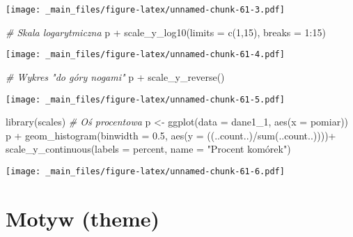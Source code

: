 \documentclass[
]{book}
\newenvironment{Shaded}{\begin{snugshade}}{\end{snugshade}}
\newcommand{\AttributeTok}[1]{\textcolor[rgb]{0.77,0.63,0.00}{#1}}
\newcommand{\CommentTok}[1]{\textcolor[rgb]{0.56,0.35,0.01}{\textit{#1}}}
\newcommand{\DecValTok}[1]{\textcolor[rgb]{0.00,0.00,0.81}{#1}}
\newcommand{\FloatTok}[1]{\textcolor[rgb]{0.00,0.00,0.81}{#1}}
\newcommand{\FunctionTok}[1]{\textcolor[rgb]{0.00,0.00,0.00}{#1}}
\newcommand{\NormalTok}[1]{#1}
\newcommand{\OtherTok}[1]{\textcolor[rgb]{0.56,0.35,0.01}{#1}}
\newcommand{\SpecialCharTok}[1]{\textcolor[rgb]{0.00,0.00,0.00}{#1}}
\newcommand{\StringTok}[1]{\textcolor[rgb]{0.31,0.60,0.02}{#1}}
\begin{document}
\texttt{[image: \_main\_files/figure-latex/unnamed-chunk-61-3.pdf]}

\begin{Shaded}
\begin{Highlighting}[]
\CommentTok{\# Skala logarytmiczna}
\NormalTok{p }\SpecialCharTok{+} \FunctionTok{scale\_y\_log10}\NormalTok{(}\AttributeTok{limits =} \FunctionTok{c}\NormalTok{(}\DecValTok{1}\NormalTok{,}\DecValTok{15}\NormalTok{), }\AttributeTok{breaks =} \DecValTok{1}\SpecialCharTok{:}\DecValTok{15}\NormalTok{)}
\end{Highlighting}
\end{Shaded}

\texttt{[image: \_main\_files/figure-latex/unnamed-chunk-61-4.pdf]}

\begin{Shaded}
\begin{Highlighting}[]
\CommentTok{\# Wykres "do góry nogami"}
\NormalTok{p }\SpecialCharTok{+} \FunctionTok{scale\_y\_reverse}\NormalTok{()}
\end{Highlighting}
\end{Shaded}

\texttt{[image: \_main\_files/figure-latex/unnamed-chunk-61-5.pdf]}

\begin{Shaded}
\begin{Highlighting}[]
\FunctionTok{library}\NormalTok{(scales)}
\CommentTok{\# Oś procentowa}
\NormalTok{p }\OtherTok{\textless{}{-}} \FunctionTok{ggplot}\NormalTok{(}\AttributeTok{data =}\NormalTok{ dane1\_1, }\FunctionTok{aes}\NormalTok{(}\AttributeTok{x =}\NormalTok{ pomiar))}
\NormalTok{p }\SpecialCharTok{+} \FunctionTok{geom\_histogram}\NormalTok{(}\AttributeTok{binwidth =} \FloatTok{0.5}\NormalTok{, }\FunctionTok{aes}\NormalTok{(}\AttributeTok{y =}\NormalTok{ ((..count..)}\SpecialCharTok{/}\FunctionTok{sum}\NormalTok{(..count..))))}\SpecialCharTok{+}
  \FunctionTok{scale\_y\_continuous}\NormalTok{(}\AttributeTok{labels =}\NormalTok{ percent, }\AttributeTok{name =} \StringTok{"Procent komórek"}\NormalTok{)}
\end{Highlighting}
\end{Shaded}

\texttt{[image: \_main\_files/figure-latex/unnamed-chunk-61-6.pdf]}

\hypertarget{motyw-theme}{%
\section{Motyw (theme)}\label{motyw-theme}}
\end{document}
